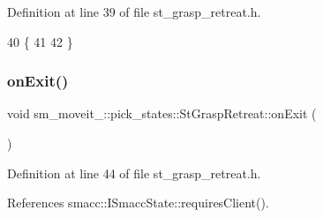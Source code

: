 Definition at line 39 of file st\+\_\+grasp\+\_\+retreat.\+h.


\begin{DoxyCode}
40     \{
41         
42     \}
\end{DoxyCode}
\mbox{\label{structsm__moveit__4_1_1pick__states_1_1StGraspRetreat_ae6035a6317e164c80e98220cd860260b}} 
\subsubsection{\texorpdfstring{on\+Exit()}{onExit()}}
{\footnotesize\ttfamily void sm\+\_\+moveit\+\_\+::pick\+\_\+states\+::\+St\+Grasp\+Retreat\+::on\+Exit (\begin{DoxyParamCaption}\item[{\hyperlink{structsmacc_1_1default__transition__tags_1_1SUCCESS}{S\+U\+C\+C\+E\+SS}}]{ }\end{DoxyParamCaption})\hspace{0.3cm}{\ttfamily [inline]}}



Definition at line 44 of file st\+\_\+grasp\+\_\+retreat.\+h.



References smacc\+::\+I\+Smacc\+State\+::requires\+Client().


